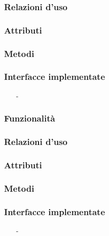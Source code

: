 \subsubsection*{Relazioni d'uso}

\subsubsection*{Attributi}

\subsubsection*{Metodi}


\subsubsection*{Interfacce implementate}
\begin{itemize}[noitemsep,nolistsep]
  \item[-] 
\end{itemize}

\subsubsection*{Funzionalità}

\subsubsection*{Relazioni d'uso}

\subsubsection*{Attributi}

\subsubsection*{Metodi}


\subsubsection*{Interfacce implementate}
\begin{itemize}[noitemsep,nolistsep]
  \item[-] 
\end{itemize}


